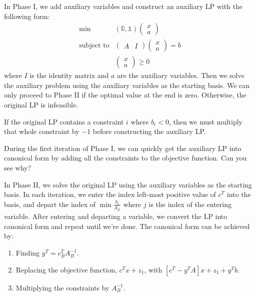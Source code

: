 \documentclass[a4paper]{report}
\newcommand{\m}[1]{\begin{pmatrix}
	#1
\end{pmatrix}}
\begin{document}
	\begin{definition}
		\label{phase:i} In Phase I, we add auxiliary variables and construct an
		auxiliary LP with the following form:
		\begin{equation*}
			\begin{aligned}
				\min              & (\mathbb{0}, \mathbb{1}) \m{x \\ a} \\
				\text{subject to} & \m{A & I} \m{x \\ a} = b            \\
				                  & \m{x \\ a} \geq 0
			\end{aligned}
		\end{equation*}
		where $I$ is the identity matrix and $a$ are the auxiliary variables. Then
		we solve the auxiliary problem using the auxiliary variables as the starting
		basis. We can only proceed to Phase II if the optimal value at the end is zero.
		Otherwise, the original LP is infeasible.
		\begin{note}
			If the original LP contains a constraint $i$ where $b_{i} < 0$, then we
			must multiply that whole constraint by $-1$ before constructing the
			auxiliary LP.
		\end{note}
		\begin{tip}
			During the first iteration of Phase I, we can quickly get the auxiliary LP
			into canonical form by adding all the constraints to the objective
			function. Can you see why?
		\end{tip}
	\end{definition}

	\begin{definition}
		In Phase II, we solve the original LP using the auxiliary variables as the
		starting basis. In each iteration, we enter the index left-most positive
		value of $c^{T}$ into the basis, and depart the index of $\min \frac{b_{i}}{A_{ji}}$
		where $j$ is the index of the entering variable. After entering and
		departing a variable, we convert the LP into canonical form and repeat until
		we're done. The canonical form can be achieved by:
		\begin{enumerate}
			\item Finding $y^{T} = c_{B}^{T} A_{B}^{-1}$.

			\item Replacing the objective function, $c^{T} x + z_{1}$, with $[c^{T} - y
				^{T} A]x + z_{1} + y^{T} b$.

			\item Multiplying the constraints by $A_{B}^{-1}$.
		\end{enumerate}
	\end{definition}
\end{document}
